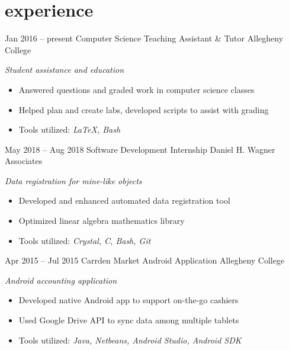 \documentclass[]{friggeri-cv}
\begin{document}
\section{experience}
\begin{entrylist}
  \entry
    {Jan 2016 -- present}
    {Computer Science Teaching Assistant \& Tutor}
    {Allegheny College}
    {\emph{Student assistance and education}
    \begin{itemize}[leftmargin=1.2em]
    \item Answered questions and graded work in computer science classes
    \item Helped plan and create labs, developed scripts to assist with grading
    \item Tools utilized: \emph{\LaTeX , Bash}
    \end{itemize}}
  \entry
    {May 2018 -- Aug 2018}
    {Software Development Internship}
    {Daniel H. Wagner Associates}
    {\emph{Data registration for mine-like objects}
    \begin{itemize}[leftmargin=1.2em]
    \item Developed and enhanced automated data registration tool
    \item Optimized linear algebra mathematics library
    \item Tools utilized: \emph{Crystal, C, Bash, Git}
    \end{itemize}}
  \entry
    {Apr 2015 -- Jul 2015}
    {Carrden Market Android Application}
    {Allegheny College}
    {\emph{Android accounting application}
    \begin{itemize}[leftmargin=1.2em]
    \item Developed native Android app to support on-the-go cashiers
    \item Used Google Drive API to sync data among multiple tablets
    \item Tools utilized: \emph{Java, Netbeans, Android Studio, Android SDK}
    \end{itemize}}
\end{entrylist}
\end{document}

